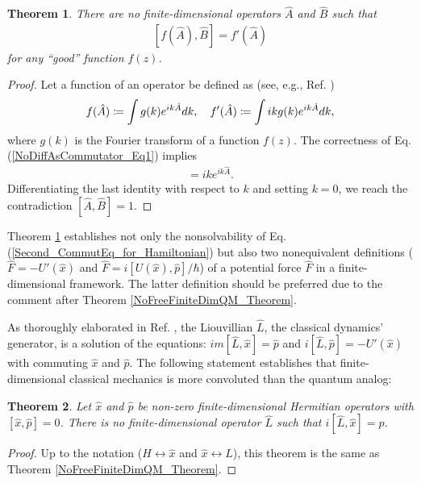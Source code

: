 \documentclass[twocolumn,pra,aps,showpacs,preprintnumbers,nofootinbib, superscriptaddress, amsmath,amssymb]{revtex4}
\newcommand*{\commut}[1]{[ #1 ]}
\newtheorem{theorem}{Theorem}
\begin{document}
\begin{theorem}\label{NoDiffAsCommutator_Theorem}
	There are no finite-dimensional operators $\hat{A}$ and $\hat{B}$ such that 
	\begin{align}\label{NoDiffAsCommutator_Eq1}
		\commut{ f(\hat{A}), \hat{B} } =  f'(\hat{A})
	\end{align}
	for any ``good'' function $f(z)$.
\end{theorem}
\begin{proof}
	Let a function of an operator be defined as  (see, e.g., Ref. \cite{Nazaikinskii1992})
	\begin{align}
		f(\hat{A}) \coloneqq \int g(k) e^{ik\hat{A}} dk, \quad f'(\hat{A}) \coloneqq \int ik g(k) e^{ik\hat{A}} dk, \notag
	\end{align}
	where $g(k)$ is the Fourier transform of a function $f(z)$. The correctness of Eq. (\ref{NoDiffAsCommutator_Eq1}) implies 
	\begin{align}
		\commut{ e^{ik\hat{A}}, \hat{B} } = ik e^{ik\hat{A}}.
	\end{align}
	Differentiating the last identity with respect to $k$ and setting $k=0$, we reach the contradiction $\commut{ \hat{A}, \hat{B} } = 1$.
\end{proof}
Theorem \ref{NoDiffAsCommutator_Theorem} establishes not only the nonsolvability of  Eq. (\ref{Second_CommutEq_for_Hamiltonian}) but also two nonequivalent definitions ($\hat{F} = - U'(\hat{x})$ and $\hat{F} = i\commut{U(\hat{x}), \hat{p}}/\hbar$) of a potential force $\hat{F}$ in a finite-dimensional framework. The latter definition should be preferred due to the comment after Theorem \ref{NoFreeFiniteDimQM_Theorem}.

As thoroughly elaborated in Ref. \cite{Bondar2011c}, the Liouvillian $\hat{L}$, the classical dynamics' generator, is a solution of the equations: $im\commut{ \hat{L}, \hat{x} } = \hat{p}$ and $i\commut{\hat{L}, \hat{p}} = -U'(\hat{x})$ with commuting $\hat{x}$ and $\hat{p}$. The following statement establishes that finite-dimensional classical mechanics is more convoluted than the quantum analog:
\begin{theorem}\label{NoFiniteDimClassicalMecahnics}
	Let $\hat{x}$ and $\hat{p}$ be non-zero finite-dimensional Hermitian operators with $\commut{\hat{x}, \hat{p}} = 0$. There is no finite-dimensional operator $\hat{L}$ such that $i\commut{ \hat{L}, \hat{x} } = \hat{p}$. 
\end{theorem}
\begin{proof}
	Up to the notation ($\hat{H} \leftrightarrow \hat{x}$ and $\hat{x} \leftrightarrow \hat{L}$), this theorem is the same as Theorem \ref{NoFreeFiniteDimQM_Theorem}. 
\end{proof}
\end{document}
